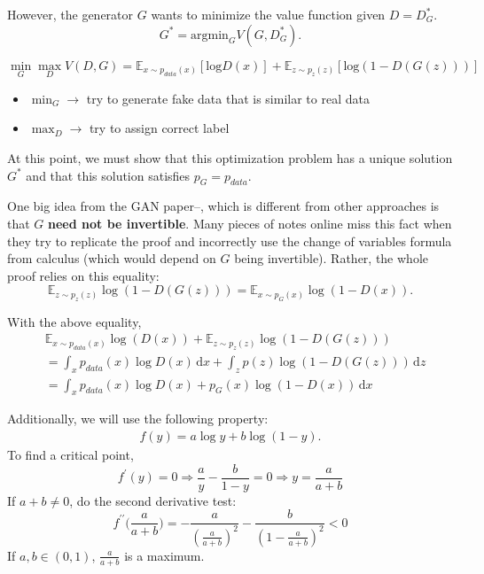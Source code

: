 However, the generator $G$ wants to minimize the value function given $D=D^*_G$. 
\begin{equation*}
G^* = \text{argmin}_G V(G,D_G^*).
\end{equation*}

\begin{equation*}
\min_{G}\max_{D}V(D,G) =  \mathbb{E}_{x\sim p_{data}(x)}[\textrm{log}D(x)]+\mathbb{E}_{z\sim p_{z}(z)}[\textrm{log}(1-D(G(z)))]
\end{equation*}
\begin{itemize}
	\item $\min_{G} \rightarrow$ try to generate fake data that is similar to real data
	\item $\max_{D} \rightarrow$ try to assign correct label \footnotemark
\end{itemize}

At this point, we must show that this optimization problem has a unique solution $G^*$ and that this solution satisfies $p_G=p_{data}$.


One big idea from the GAN paper–, which is different from other approaches is that $G$ \textbf{need not be invertible}. Many pieces of notes online miss this fact when they try to replicate the proof and incorrectly use the change of variables formula from calculus (which would depend on $G$ being invertible). Rather, the whole proof relies on this equality:
\begin{equation*}
	\mathbb{E}_{z \sim p_{z}(z)}\log(1-D(G(z))) = \mathbb{E}_{x \sim p_{G}(x)}\log(1-D(x)) .
\end{equation*}

With the above equality, 
\begin{align*}
	&\mathbb{E}_{x \sim p_{data}(x)}\log(D(x))+\mathbb{E}_{z \sim p_z(z)}\log(1-D(G(z)))\\
	&=\int_{x} p_{data}(x)\log D(x) \, \mathrm{d}x + \int_{z} p(z)\log ( 1- D(G(z))) \, \mathrm{d}z\\ 
	&= \int_{x} p_{data}(x)\log D(x) + p_G(x) \log ( 1- D(x)) \, \mathrm{d}x
\end{align*}

Additionally, we will use the following property:
\begin{align*}
	f(y)= a \log y + b \log(1-y).
\end{align*}
To find a critical point,
$$f^\prime(y) = 0 \Rightarrow \frac{a}{y} - \frac{b}{1-y} = 0 \Rightarrow y = \frac{a}{a+b}$$
If $a+b\neq0$, do the second derivative test:
$$f^{\prime\prime}\big ( \frac{a}{a+b} \big) = - \frac{a}{(\frac{a}{a+b})^2} - \frac{b}{(1-\frac{a}{a+b})^2} < 0
$$
If $a,b\in (0,1)$, $\frac{a}{a+b}$ is a maximum.

